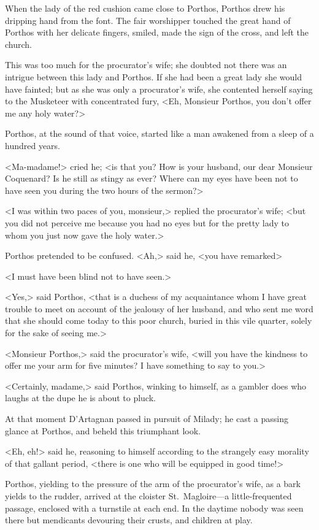 When the lady of the red cushion came close to Porthos, Porthos drew his dripping hand from the font. The fair worshipper touched the great hand of Porthos with her delicate fingers, smiled, made the sign of the cross, and left the church. 

This was too much for the procurator's wife; she doubted not there was an intrigue between this lady and Porthos. If she had been a great lady she would have fainted; but as she was only a procurator's wife, she contented herself saying to the Musketeer with concentrated fury, <Eh, Monsieur Porthos, you don't offer me any holy water?> 

Porthos, at the sound of that voice, started like a man awakened from a sleep of a hundred years. 

<Ma-madame!> cried he; <is that you? How is your husband, our dear Monsieur Coquenard? Is he still as stingy as ever? Where can my eyes have been not to have seen you during the two hours of the sermon?> 

<I was within two paces of you, monsieur,> replied the procurator's wife; <but you did not perceive me because you had no eyes but for the pretty lady to whom you just now gave the holy water.> 

Porthos pretended to be confused. <Ah,> said he, <you have remarked\longdash> 

<I must have been blind not to have seen.> 

<Yes,> said Porthos, <that is a duchess of my acquaintance whom I have great trouble to meet on account of the jealousy of her husband, and who sent me word that she should come today to this poor church, buried in this vile quarter, solely for the sake of seeing me.> 

<Monsieur Porthos,> said the procurator's wife, <will you have the kindness to offer me your arm for five minutes? I have something to say to you.> 

<Certainly, madame,> said Porthos, winking to himself, as a gambler does who laughs at the dupe he is about to pluck. 

At that moment D'Artagnan passed in pursuit of Milady; he cast a passing glance at Porthos, and beheld this triumphant look. 

<Eh, eh!> said he, reasoning to himself according to the strangely easy morality of that gallant period, <there is one who will be equipped in good time!> 

Porthos, yielding to the pressure of the arm of the procurator's wife, as a bark yields to the rudder, arrived at the cloister St.~Magloire—a little-frequented passage, enclosed with a turnstile at each end. In the daytime nobody was seen there but mendicants devouring their crusts, and children at play. 

